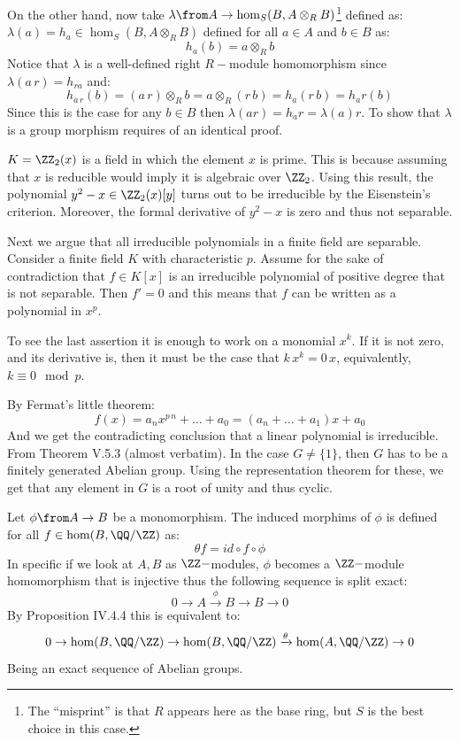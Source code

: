 On the other hand, now take $\lambda \from A \to \hom_S(B,A\otimes_R B)$\footnote{The ``misprint''  is that $R$ appears here as the base ring, but $S$ is the best choice in this case.} defined as: $\lambda (a) = h_a\in \hom_S(B,A\otimes_R B)$ defined for all $a\in A$ and $b\in B$ as: 
$$h_a(b) = a \otimes_R b $$
Notice that $\lambda$ is a well-defined right $R-$module homomorphism since $\lambda(a\,r) = h_{ra}$ and:
$$h_{a\,r}(b) = (a\, r) \otimes_ R b = a \otimes_ R (r\,b)= h_a(r\, b) = h_ar(b)$$
Since this is the case for any $b\in B$ then $\lambda(ar)= h_a r= \lambda(a)r$. To show that $\lambda$ is a group morphism requires of  an identical proof.

$K=\ZZ_2(x)$ is a field in which the element $x$ is prime. This is because assuming that $x$ is reducible would imply it is algebraic over $\ZZ_2$. Using this result, the polynomial $y^2- x\in \ZZ_2(x)[y]$ turns out to be irreducible by the Eisenstein's criterion. Moreover, the formal derivative of $y^2-x$ is zero and thus not separable.

Next we argue that all irreducible polynomials in a finite field are separable. Consider a finite field $K$ with characteristic $p$. Assume for the sake of contradiction that $f\in K[x]$ is an irreducible polynomial of positive degree that is not separable. Then $f'=0$ and this means that $f$ can be written as a polynomial in $x^p$. 

To see the last assertion it is enough to work on a monomial $x^k$. If it is not zero, and its derivative is, then it must be the case that $k\, x^{k}=0\, x$, equivalently, $k\equiv 0 \mod p$.

By Fermat's little theorem:
$$f(x) = a_n x^{p\,n}+\ldots + a_0 = (a_n+\ldots +a_1)x +a_0$$
And we get the contradicting conclusion that a linear polynomial is irreducible.
From Theorem V.5.3 (almost verbatim). In the case $G\neq \{1\}$, then $G$ has to be a finitely generated Abelian group. Using the representation theorem for these, we get that any element in $G$ is a root of unity and thus cyclic.

Let $\phi \from A\to B$ be a monomorphism. The induced morphims of $\phi$ is defined for all $f\in \hom(B,\QQ/\ZZ)$ as: 
$$\theta f= id\circ f\circ \phi$$
In specific if we look at $A,B$ as $\ZZ-$modules,  $\phi$ becomes a $\ZZ-$module homomorphism that is injective thus the following sequence is split exact:
$$0\to A \xrightarrow \phi B \to B \to 0$$
By Proposition IV.4.4 this is equivalent to:
$$0\to \hom(B,\QQ/\ZZ) \to \hom(B,\QQ/\ZZ) \xrightarrow \theta \hom(A,\QQ/\ZZ) \to 0$$
Being an exact sequence of Abelian groups. 

